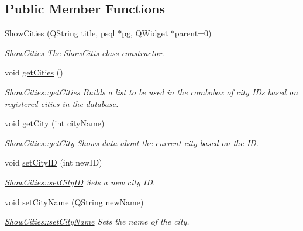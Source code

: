 \subsection*{Public Member Functions}
\begin{DoxyCompactItemize}
\item 
\hyperlink{class_show_cities_a71a514390bebd22b5e6ecbb6b731979a}{Show\+Cities} (Q\+String title, \hyperlink{classpsql}{psql} $\ast$pg, Q\+Widget $\ast$parent=0)
\begin{DoxyCompactList}\small\item\em \hyperlink{class_show_cities}{Show\+Cities} The Show\+Citis class constructor. \end{DoxyCompactList}\item 
\mbox{\label{class_show_cities_a8026675035c0bce6dab846262e1da0c5}} 
void \hyperlink{class_show_cities_a8026675035c0bce6dab846262e1da0c5}{get\+Cities} ()
\begin{DoxyCompactList}\small\item\em \hyperlink{class_show_cities_a8026675035c0bce6dab846262e1da0c5}{Show\+Cities\+::get\+Cities} Builds a list to be used in the combobox of city I\+Ds based on registered cities in the database. \end{DoxyCompactList}\item 
void \hyperlink{class_show_cities_af191eeab72b3bdd74f0e710face98292}{get\+City} (int city\+Name)
\begin{DoxyCompactList}\small\item\em \hyperlink{class_show_cities_af191eeab72b3bdd74f0e710face98292}{Show\+Cities\+::get\+City} Shows data about the current city based on the ID. \end{DoxyCompactList}\item 
void \hyperlink{class_show_cities_acd17480ad6a64e989e9aa0b07d30141b}{set\+City\+ID} (int new\+ID)
\begin{DoxyCompactList}\small\item\em \hyperlink{class_show_cities_acd17480ad6a64e989e9aa0b07d30141b}{Show\+Cities\+::set\+City\+ID} Sets a new city ID. \end{DoxyCompactList}\item 
void \hyperlink{class_show_cities_acadd6c1bdb26d30e796bab4b5b2acfd9}{set\+City\+Name} (Q\+String new\+Name)
\begin{DoxyCompactList}\small\item\em \hyperlink{class_show_cities_acadd6c1bdb26d30e796bab4b5b2acfd9}{Show\+Cities\+::set\+City\+Name} Sets the name of the city. \end{DoxyCompactList}\item 

\end{DoxyCompactItemize}
